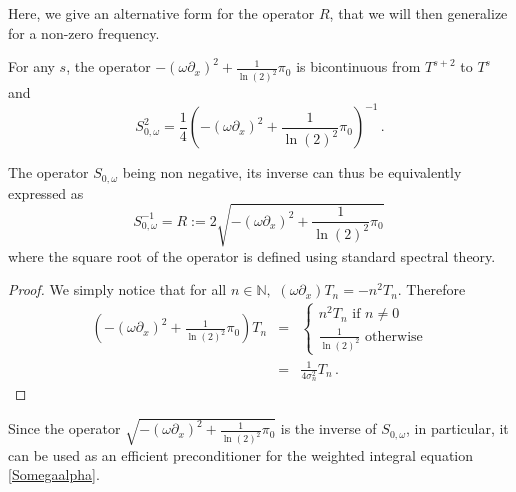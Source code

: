 \documentclass[a4paper]{subfiles}
\begin{document}
Here, we give an alternative form for the operator $R$, that we will then generalize for a non-zero frequency. 
%
\begin{theorem}
	\label{TheSdx2S}
	For any $s$, the operator $-(\omega\partial_x)^2 + \frac{1}{\ln(2)^2} \pi_0 $ is bicontinuous from $T^{s+2}$ to $T^s$ and
	\begin{equation*}
		S_{0,\omega}^2 = \frac{1}{4}\left(-(\omega\partial_x)^2 + \frac{1}{\ln(2)^2} \pi_0 \right)^{-1}\,.
	\end{equation*}
\end{theorem}
\begin{corollary} The operator $S_{0,\omega}$ being non negative, its inverse can thus be equivalently expressed as 
\[S_{0,\omega}^{-1} = R := 2\sqrt{-(\omega \partial_x)^2 + \frac{1}{\ln(2)^2}\pi_0}\,\]
where the square root of the operator is defined using standard spectral theory. 
\end{corollary}
\begin{proof}
We simply notice that for all $n\in \mathbb{N},\,\,(\omega \partial_x)T_n = -n^2 T_n$. Therefore
\begin{eqnarray*}
 \left(-(\omega\partial_x)^2 + \frac{1}{\ln(2)^2} \pi_0\right)T_n  &=& \left\{
 \begin{array}{l} 
 n^2 T_n \mbox{ if } n\ne 0\\
 \frac{1}{\ln(2)^2} \mbox{ otherwise}
 \end{array}
 \right.\\
 &=& \frac{1}{4\sigma_n^2} T_n\,.
 \end{eqnarray*}
\end{proof}
Since the operator $\sqrt{-(\omega \partial_x)^2 + \frac{1}{\ln(2)^2}\pi_0}$ is the inverse of $S_{0,\omega}$, in particular, it can be used as an efficient preconditioner for the weighted integral equation \eqref{Somegaalpha}. 
\end{document}
